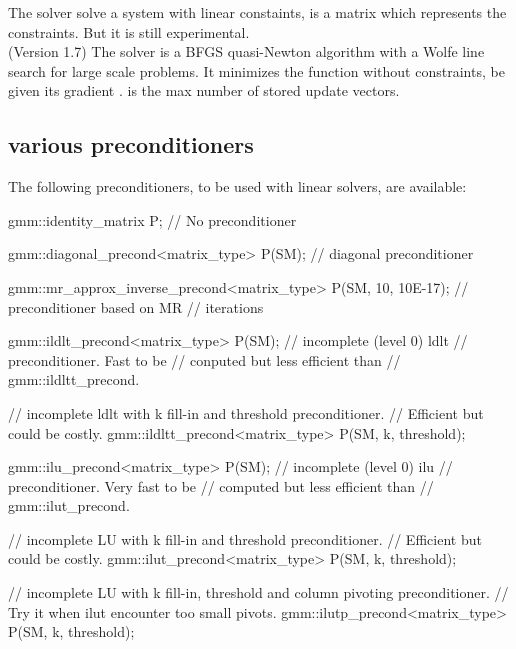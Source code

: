 \documentclass[11pt,a4paper]{article}
\begin{document}
The solver  solve a system with linear constaints,  is a matrix which represents the constraints. But it is still experimental.\\

(Version 1.7) The solver  is a BFGS quasi-Newton algorithm with a Wolfe line search for large scale problems. It minimizes the function  without constraints, be given its gradient .  is the max number of stored update vectors.

\subsection{various preconditioners}
The following preconditioners, to be used with linear solvers, are available: 
\begin{cppcode}
  gmm::identity_matrix P;   // No preconditioner 

  gmm::diagonal_precond<matrix_type> P(SM); // diagonal preconditioner
 
  gmm::mr_approx_inverse_precond<matrix_type> P(SM, 10, 10E-17);
                                               // preconditioner based on MR
                                               // iterations

  gmm::ildlt_precond<matrix_type> P(SM); // incomplete (level 0) ldlt 
                                        // preconditioner. Fast to be
                                        // conputed but less efficient than
                                        // gmm::ildltt_precond.

  // incomplete ldlt with k fill-in and threshold preconditioner.
  // Efficient but could be costly.
  gmm::ildltt_precond<matrix_type> P(SM, k, threshold);

  gmm::ilu_precond<matrix_type> P(SM);  // incomplete (level 0) ilu 
                                        // preconditioner. Very fast to be
                                        // computed but less efficient than
                                        // gmm::ilut_precond.


  // incomplete LU with k fill-in and threshold preconditioner.
  // Efficient but could be costly.
  gmm::ilut_precond<matrix_type> P(SM, k, threshold);

  // incomplete LU with k fill-in, threshold and column pivoting preconditioner.
  // Try it when ilut encounter too small pivots. 
  gmm::ilutp_precond<matrix_type> P(SM, k, threshold);
\end{cppcode}
\end{document}

